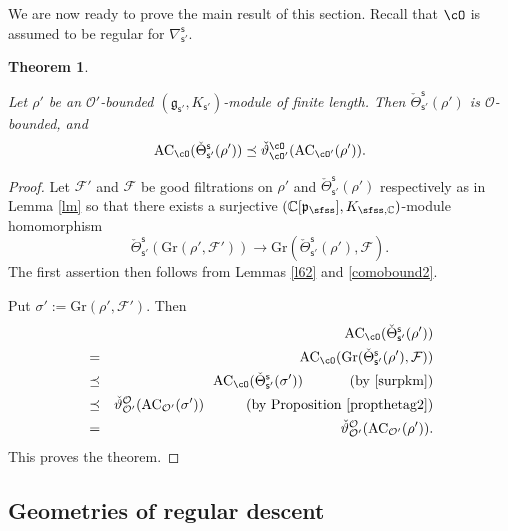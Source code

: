 \documentclass[11pt,a4paper]{amsart}
\newcommand{\CF}{{\mathcal {F}}}
\newcommand{\CO}{{\mathcal {O}}}
\newcommand{\g}{\mathfrak g}
\newcommand{\p}{\mathfrak p}
\def\DD{\nabla}
\newcommand{\be}{\begin {equation}}
\newcommand{\ee}{\end {equation}}
\numberwithin{equation}{section}
\newtheorem{thm}{Theorem}[section]
\theoremstyle{remark}
\def\UU{\rU}
\def\cOp{\cO^{\prime}}
\begin{document}
We are now ready to prove the main result of this section. Recall that  $\cO$ is assumed to be  regular  for $\DD_{\mathsf s'}^{\mathsf s}$.
\begin{thm}\label{prop:GDS.AC}

  Let $\rho'$ be an $\CO'$-bounded $(\g_{\mathsf s'}, K_{\mathsf s'})$-module of finite length. Then  $\check \Theta_{\mathsf s'}^{\mathsf s}(\rho')$ is $\CO$-bounded, and
    \[
    \mathrm{AC}_{\cO}(\check \Theta_{\mathsf s'}^{\mathsf s}(\rho'))\preceq \check \vartheta_{\cO'}^\cO(\mathrm{AC}_{\cO'}(\rho')).
  \]
\end{thm}
\begin{proof}
Let $\CF'$ and $\CF$ be  good filtrations  on $\rho'$ and  $\check \Theta_{\mathsf s'}^{\mathsf s}(\rho')$ respectively as in Lemma \ref{lm} so that there exists a
 surjective $(\C[\p_{\sfss}], K_{\sfss, \C})$-module homomorphism
\be\label{surpkm}
  \check \Theta_{\mathsf s'}^{\mathsf s}(\mathrm{Gr}(\rho',\CF')) \rightarrow \mathrm{Gr}(\check \Theta_{\mathsf s'}^{\mathsf s}(\rho'),\CF).
\ee
The first assertion then follows from Lemmas \ref{l62} and \ref{comobound2}.

Put $\sigma':=\mathrm{Gr}(\rho',\CF')$.
Then
\begin{eqnarray*}
      && \mathrm{AC}_{\cO}(\check \Theta_{\mathsf s'}^{\mathsf s}(\rho'))\\
      &=&  \mathrm{AC}_{\cO}(\mathrm{Gr}(\check \Theta_{\mathsf s'}^{\mathsf s}(\rho'),\CF))\\
             &\preceq& \mathrm{AC}_{\cO}(\check \Theta_{\mathsf s'}^{\mathsf s}(\sigma')) \quad\  \qquad (\textrm{by \eqref{surpkm}})\\
          &  \preceq & \check \vartheta_{\CO'}^{\CO}(\mathrm{AC}_{\CO'}(\sigma'))\quad \qquad (\textrm{by Proposition \ref{propthetag2}})\\
               &=&\check \vartheta_{\CO'}^{\CO}(\mathrm{AC}_{\CO'}(\rho')).
               \end{eqnarray*}
This proves the theorem.
\end{proof}


\subsection{Geometries of regular descent}
\label{sec:GG}


\def\UU{{\bar \partial}}
\def\dbM{\breve{M}}
\def\dbMM{\breve{MM}}
\def\dbX{\breve{X}}
\def\dbfpp{\breve{\fpp}}
\def\ZdbX{\cZ_{\dbX}}
\def\aV{\acute{V}}
\def\fggs{\fgg_{\sfss}}
\def\fggsp{\fgg_{\sfss'}}
\def\fggspp{\fgg_{\sfss''}}
\def\fggspo{\fgg_{\sfss'_0}}
\def\fggspt{\fgg_{\sfss'_1}}
\def\fggspi{\fgg_{\sfss'_i}}
\def\fkks{\fkk_{\sfss}}
\def\fkksp{\fkk_{\sfss'}}
\def\fkkspo{\fkk_{\sfss'_0}}
\def\fkkspt{\fkk_{\sfss'_1}}
\def\fkkspi{\fkk_{\sfss'_i}}
\def\fpps{\fpp_{\sfss}}
\def\fppsp{\fpp_{\sfss'}}
\def\fppspo{\fpp_{\sfss'_0}}
\def\fppspt{\fpp_{\sfss'_1}}
\def\fppspi{\fpp_{\sfss'_i}}
\def\DDss{\DD_{\sfss'}^{\sfss}}
\def\DDsso{\DD_{\sfss'_0}^{\sfss}}
\def\cOpo{\cOp_{0}}
\def\Mss{M_{\sfss,\sfss'}}
\def\Ms{M_{\sfss}}
\def\Msp{M_{\sfss'}}
\end{document}

